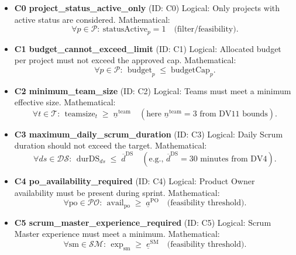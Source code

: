 \documentclass[11pt,a4paper]{article}
\begin{document}
\begin{itemize}
  \item \textbf{C0 project\_status\_active\_only} (ID: C0)\newline
  Logical: Only projects with active status are considered.\newline
  Mathematical:
  \[
    \forall p\in\mathcal{P}:\ \text{statusActive}_{p}=1 \quad \text{(filter/feasibility)}.
  \]

  \item \textbf{C1 budget\_cannot\_exceed\_limit} (ID: C1)\newline
  Logical: Allocated budget per project must not exceed the approved cap.\newline
  Mathematical:
  \[
    \forall p\in\mathcal{P}:\ \ \text{budget}_{p} \;\le\; \text{budgetCap}_{p}.
  \]

  \item \textbf{C2 minimum\_team\_size} (ID: C2)\newline
  Logical: Teams must meet a minimum effective size.\newline
  Mathematical:
  \[
    \forall t\in\mathcal{T}:\ \ \text{teamsize}_{t} \;\ge\; \underline{n}^{\text{team}} \quad (\text{here }\underline{n}^{\text{team}}=3\text{ from DV11 bounds}).
  \]

  \item \textbf{C3 maximum\_daily\_scrum\_duration} (ID: C3)\newline
  Logical: Daily Scrum duration should not exceed the target.\newline
  Mathematical:
  \[
    \forall ds\in\mathcal{DS}:\ \ \text{durDS}_{ds} \;\le\; \overline{d}^{\text{DS}} \quad (\text{e.g., }\overline{d}^{\text{DS}}=30\text{ minutes from DV4}).
  \]

  \item \textbf{C4 po\_availability\_required} (ID: C4)\newline
  Logical: Product Owner availability must be present during sprint.\newline
  Mathematical:
  \[
    \forall \text{po}\in\mathcal{PO}:\ \ \text{avail}_{\text{po}} \;\ge\; \underline{a}^{\text{PO}} \quad \text{(feasibility threshold)}.
  \]

  \item \textbf{C5 scrum\_master\_experience\_required} (ID: C5)\newline
  Logical: Scrum Master experience must meet a minimum.\newline
  Mathematical:
  \[
    \forall \text{sm}\in\mathcal{SM}:\ \ \text{exp}_{\text{sm}} \;\ge\; \underline{e}^{\text{SM}} \quad \text{(feasibility threshold)}.
  \]


\end{itemize}
\end{document}
